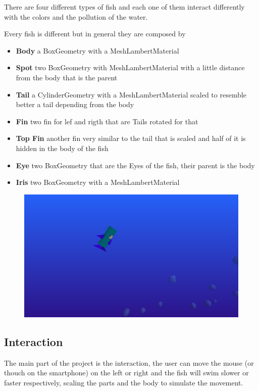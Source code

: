 \documentclass[a4paper,10pt]{article}
\begin{document}
There are four different types of fish and each one of them interact differently with the colors and the pollution of the water.

Every fish is different but in general they are composed by

\begin{itemize}
 \item {\bf  Body} a BoxGeometry with a MeshLambertMaterial
 \item {\bf  Spot} two BoxGeometry with MeshLambertMaterial with a little distance from the body that is the parent
 \item {\bf  Tail} a CylinderGeometry with a MeshLambertMaterial scaled to resemble better a tail depending from the body
 \item {\bf Fin} two fin for lef and rigth that are Tails rotated for that
 \item {\bf  Top Fin} another fin very similar to the tail that is scaled and half of it is hidden in the body of the fish 
 \item {\bf  Eye} two BoxGeometry that are the Eyes of the fish, their parent is the body
 \item {\bf Iris} two BoxGeometry with a MeshLambertMaterial

\end{itemize}

\begin{figure}[H]
  \includegraphics[width=\linewidth]{Screenshot_20190226_203131.png}
\end{figure}





\subsection{Interaction}
The main part of the project is the interaction, the user can move the mouse (or thouch on the smartphone) on the left or right and the fish will swim slower or faster respectively, scaling the parts and the body to simulate the movement.
\end{document}
